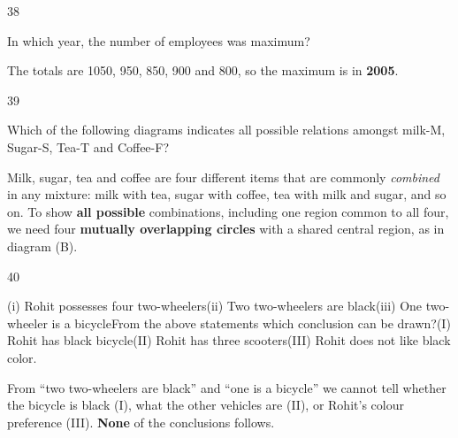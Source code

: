 \begin{question}{38}
{In which year, the number of employees was maximum?\par}
\begin{explain}
The totals are 1050, 950, 850, 900 and 800, so the maximum is in \textbf{2005}.
\end{explain}
\end{question}

\begin{question}{39}
{Which of the following diagrams indicates all possible relations amongst milk-M, Sugar-S, Tea-T and Coffee-F?\par}
\begin{explain}
Milk, sugar, tea and coffee are four different items that are commonly \emph{combined} in any mixture: milk with tea, sugar with coffee, tea with milk and sugar, and so on. To show \textbf{all possible} combinations, including one region common to all four, we need four \textbf{mutually overlapping circles} with a shared central region, as in diagram (B).
\end{explain}
\end{question}

\begin{question}{40}
{(i) Rohit possesses four two-wheelers\newline (ii) Two two-wheelers are black\newline (iii) One two-wheeler is a bicycle\newline From the above statements which conclusion can be drawn?\newline (I) Rohit has black bicycle\newline (II) Rohit has three scooters\newline (III) Rohit does not like black color.\par}
\begin{explain}
From ``two two-wheelers are black'' and ``one is a bicycle'' we cannot tell whether the bicycle is black (I), what the other vehicles are (II), or Rohit's colour preference (III). \textbf{None} of the conclusions follows.
\end{explain}
\end{question}

